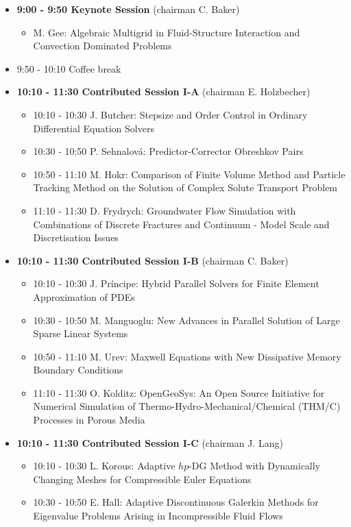 \documentclass[10pt, A4]{article}%
\begin{document}
\begin{itemize}    
  \item {\bf 9:00 - 9:50 Keynote Session} (chairman C. Baker) 
  \begin{itemize}
    \item M. Gee: Algebraic Multigrid in Fluid-Structure Interaction and Convection Dominated Problems
  \end{itemize}
  \item 9:50 - 10:10 Coffee break
  \item {\bf 10:10 - 11:30 Contributed Session I-A} (chairman E. Holzbecher) 
  \begin{itemize}
    \item 10:10 - 10:30 J. Butcher: Stepsize and Order Control in Ordinary Differential Equation Solvers
    \item 10:30 - 10:50 P. Sehnalov\'{a}: Predictor-Corrector Obreshkov Pairs
    \item 10:50 - 11:10 M. Hokr: Comparison of Finite Volume Method and Particle Tracking Method on the Solution of Complex Solute Transport Problem
    \item 11:10 - 11:30 D. Frydrych: Groundwater Flow Simulation with Combinations of Discrete Fractures and Continuum - Model Scale and Discretisation Issues
  \end{itemize}
  \item {\bf 10:10 - 11:30 Contributed Session I-B} (chairman C. Baker) 
  \begin{itemize}
    \item 10:10 - 10:30 J. Pr\'{i}ncipe: Hybrid Parallel Solvers for Finite Element Approximation of PDEs
    \item 10:30 - 10:50 M. Manguoglu: New Advances in Parallel Solution of Large Sparse Linear Systems
    \item 10:50 - 11:10 M. Urev: Maxwell Equations with New Dissipative Memory Boundary Conditions
    \item 11:10 - 11:30 O. Kolditz: OpenGeoSys: An Open Source Initiative for Numerical Simulation of Thermo-Hydro-Mechanical/Chemical (THM/C) Processes in Porous Media
  \end{itemize}
  \item {\bf 10:10 - 11:30 Contributed Session I-C} (chairman J. Lang) 
  \begin{itemize}
    \item 10:10 - 10:30 L. Korous: Adaptive $hp$-DG Method with Dynamically Changing Meshes for Compressible Euler Equations
    \item 10:30 - 10:50 E. Hall: Adaptive Discontinuous Galerkin Methods for Eigenvalue Problems Arising in Incompressible Fluid Flows

\end{itemize}
\end{itemize}
\end{document}

